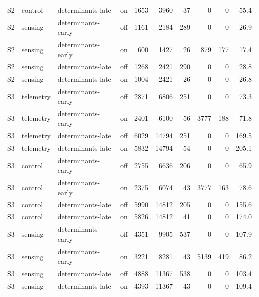 \documentclass[pdflatex,sn-nature]{sn-jnl}
\theoremstyle{thmstyleone}
\theoremstyle{thmstyletwo}
\theoremstyle{thmstylethree}
\begin{document}
\begin{table}[!htbp]
{\begin{tabular}{llllrrrrrr}
S2 & control & determinants-late & on & 1653 & 3960 & 37 & 0 & 0 & 55.4 \\
S2 & sensing & determinants-early & off & 1161 & 2184 & 289 & 0 & 0 & 26.9 \\
S2 & sensing & determinants-early & on & 600 & 1427 & 26 & 879 & 177 & 17.4 \\
S2 & sensing & determinants-late & off & 1268 & 2421 & 290 & 0 & 0 & 28.8 \\
S2 & sensing & determinants-late & on & 1004 & 2421 & 26 & 0 & 0 & 26.8 \\
S3 & telemetry & determinants-early & off & 2871 & 6806 & 251 & 0 & 0 & 73.3 \\
S3 & telemetry & determinants-early & on & 2401 & 6100 & 56 & 3777 & 188 & 71.8 \\
S3 & telemetry & determinants-late & off & 6029 & 14794 & 251 & 0 & 0 & 169.5 \\
S3 & telemetry & determinants-late & on & 5832 & 14794 & 54 & 0 & 0 & 205.1 \\
S3 & control & determinants-early & off & 2755 & 6636 & 206 & 0 & 0 & 65.9 \\
S3 & control & determinants-early & on & 2375 & 6074 & 43 & 3777 & 163 & 78.6 \\
S3 & control & determinants-late & off & 5990 & 14812 & 205 & 0 & 0 & 155.6 \\
S3 & control & determinants-late & on & 5826 & 14812 & 41 & 0 & 0 & 174.0 \\
S3 & sensing & determinants-early & off & 4351 & 9905 & 537 & 0 & 0 & 107.9 \\
S3 & sensing & determinants-early & on & 3221 & 8281 & 43 & 5139 & 419 & 86.2 \\
S3 & sensing & determinants-late & off & 4888 & 11367 & 538 & 0 & 0 & 103.4 \\
S3 & sensing & determinants-late & on & 4393 & 11367 & 43 & 0 & 0 & 109.4 \\
\bottomrule
\end{tabular}}
\end{table}
\end{document}
